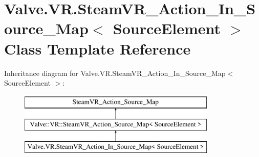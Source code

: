 \hypertarget{class_valve_1_1_v_r_1_1_steam_v_r___action___in___source___map}{}\section{Valve.\+V\+R.\+Steam\+V\+R\+\_\+\+Action\+\_\+\+In\+\_\+\+Source\+\_\+\+Map$<$ Source\+Element $>$ Class Template Reference}
\label{class_valve_1_1_v_r_1_1_steam_v_r___action___in___source___map}
Inheritance diagram for Valve.\+V\+R.\+Steam\+V\+R\+\_\+\+Action\+\_\+\+In\+\_\+\+Source\+\_\+\+Map$<$ Source\+Element $>$\+:\begin{figure}[H]
\begin{center}
\leavevmode
\includegraphics[height=3.000000cm]{class_valve_1_1_v_r_1_1_steam_v_r___action___in___source___map}
\end{center}
\end{figure}
